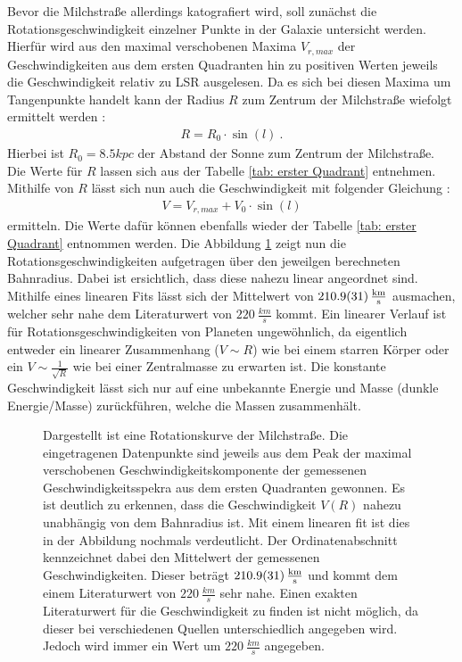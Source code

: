 Bevor die Milchstraße allerdings katografiert wird, soll zunächst die Rotationsgeschwindigkeit einzelner Punkte in der Galaxie untersicht werden. Hierfür wird aus den maximal verschobenen Maxima $V_{r,max}$ der Geschwindigkeiten aus dem ersten Quadranten hin zu positiven Werten jeweils die Geschwindigkeit relativ zu LSR ausgelesen. Da es sich bei diesen Maxima um Tangenpunkte handelt kann der Radius $R$ zum Zentrum der Milchstraße wiefolgt ermittelt werden \cite{Usermanual}:
\begin{align}
    R = R_0 \cdot \sin(l) \ .
    \label{eq:TangenteR}
\end{align}
Hierbei ist $R_0 = \si{8.5}{kpc}$ der Abstand der Sonne zum Zentrum der Milchstraße. Die Werte für $R$ lassen sich aus der Tabelle \ref{tab: erster Quadrant} entnehmen. Mithilfe von $R$ lässt sich nun auch die Geschwindigkeit mit folgender Gleichung \cite{Usermanual}:
\begin{align}
    V = V_{r,max} + V_0 \cdot \sin(l)
    \label{eq:V(R)}
\end{align}
ermitteln. Die Werte dafür können ebenfalls wieder der Tabelle \ref{tab: erster Quadrant} entnommen werden. Die Abbildung \ref{fig:VvonR} zeigt nun die Rotationsgeschwindigkeiten aufgetragen über den jeweilgen berechneten Bahnradius. Dabei ist ersichtlich, dass diese nahezu linear angeordnet sind. Mithilfe eines linearen Fits lässt sich der Mittelwert von $\SI{210.9 \pm 3.1}{\frac{km}{s}}$ ausmachen, welcher sehr nahe dem Literaturwert von $\SI{220}{\frac{km}{s}}$ \cite{LSR} kommt. Ein linearer Verlauf ist für Rotationsgeschwindigkeiten von Planeten ungewöhnlich, da eigentlich entweder ein linearer Zusammenhang ($V \sim R$) wie bei einem starren Körper oder ein $V \sim\frac{1}{\sqrt{R}}$ wie bei einer Zentralmasse zu erwarten ist. Die konstante Geschwindigkeit lässt sich nur auf eine unbekannte Energie und Masse (dunkle Energie/Masse) zurückführen, welche die Massen zusammenhält.
\begin{figure}[H]
    \centering
    
    \caption[Rotationskurve der Milchstraße]{Dargestellt ist eine Rotationskurve der Milchstraße. Die eingetragenen Datenpunkte sind jeweils aus dem Peak der maximal verschobenen Geschwindigkeitskomponente der gemessenen Geschwindigkeitsspekra aus dem ersten Quadranten gewonnen. Es ist deutlich zu erkennen, dass die Geschwindigkeit $V(R)$ nahezu unabhängig von dem Bahnradius ist. Mit einem linearen fit ist dies in der Abbildung nochmals verdeutlicht. Der Ordinatenabschnitt kennzeichnet dabei den Mittelwert der gemessenen Geschwindigkeiten. Dieser beträgt $\SI{210.9 \pm 3.1}{\frac{km}{s}}$ und kommt dem einem Literaturwert von $\SI{220}{\frac{km}{s}}$ \cite{LSR} sehr nahe. Einen exakten Literaturwert für die Geschwindigkeit zu finden ist nicht möglich, da dieser bei verschiedenen Quellen unterschiedlich angegeben wird. Jedoch wird immer ein Wert um $\SI{220}{\frac{km}{s}}$ angegeben.}
    \label{fig:VvonR}
\end{figure}
